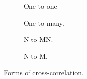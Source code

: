 \begin{figure}
	\centering
	\begin{subfigure}{0.4\textwidth}
		\centering
		\def\svgwidth{0.5\textwidth}
		
		\caption{One to one.}
		\label{fig:cross_corr_one_to_one}
	\end{subfigure}
	\hfill
	\begin{subfigure}{0.4\textwidth}
		\centering
		\def\svgwidth{0.5\textwidth}
		
		\caption{One to many.}
		\label{fig:cross_corr_one_to_many}
	\end{subfigure}
	\hfill
	\begin{subfigure}{0.4\textwidth}
		\centering
		\def\svgwidth{0.7\textwidth}
		
		\caption{N to MN.}
		\label{fig:cross_corr_n_to_mn}
	\end{subfigure}
	\hfill
	\begin{subfigure}{0.4\textwidth}
		\centering
		\def\svgwidth{0.7\textwidth}
		
		\caption{N to M.}
		\label{fig:cross_corr_n_to_m}
	\end{subfigure}
	
	\caption{Forms of cross-correlation.}
	\label{fig:cross_corr_forms}
\end{figure}




